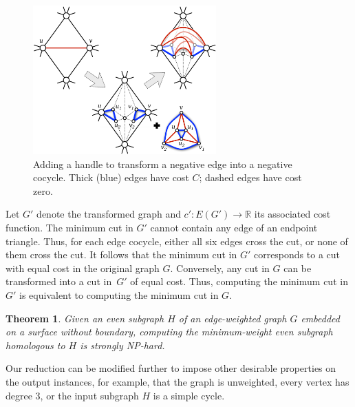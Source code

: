 \documentclass[11pt,twoside]{article}
\def\Real{\mathbb{R}}
\newtheorem{theorem}{Theorem}[section]
\begin{document}
{\begin{figure}[hbt]
\centering\includegraphics[height=2.25in]{Fig/addhandle3}
\caption{Adding a handle to transform a negative edge into a negative cocycle.  Thick (blue) edges have cost $C$; dashed edges have cost zero.}
\label{F:addhandle}
\end{figure}

Let $G'$ denote the transformed graph and $c'\colon E(G')\to \Real$ its associated cost function.  The minimum cut in $G'$ cannot contain any edge of an endpoint triangle.  Thus, for each edge cocycle, either all six edges cross the cut, or none of them cross the cut.  It follows that the minimum cut in $G'$ corresponds to a cut with equal cost in the original graph $G$.  Conversely, any cut in $G$ can be transformed into a cut in~$G'$ of equal cost.  Thus, computing the minimum cut in $G'$ is equivalent to computing the minimum cut in $G$.

\begin{theorem}
Given an even subgraph $H$ of an edge-weighted graph $G$ embedded on a surface without boundary, computing the minimum-weight even subgraph homologous to $H$ is strongly {NP}-hard.
\end{theorem}

Our reduction can be modified further to impose other desirable properties on the output instances, for example, that the graph is unweighted, every vertex has degree $3$, or the input subgraph $H$ is a simple cycle.

}
\end{document}
